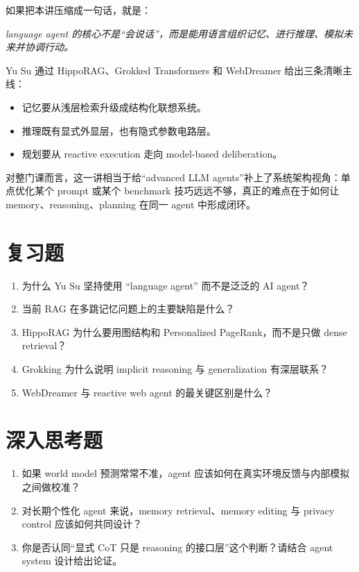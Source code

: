 如果把本讲压缩成一句话，就是：
\begin{center}
\emph{language agent 的核心不是“会说话”，而是能用语言组织记忆、进行推理、模拟未来并协调行动。}
\end{center}

Yu Su 通过 HippoRAG、Grokked Transformers 和 WebDreamer 给出三条清晰主线：
\begin{itemize}
\item 记忆要从浅层检索升级成结构化联想系统。
\item 推理既有显式外显层，也有隐式参数电路层。
\item 规划要从 reactive execution 走向 model-based deliberation。
\end{itemize}

对整门课而言，这一讲相当于给“advanced LLM agents”补上了系统架构视角：单点优化某个 prompt 或某个 benchmark 技巧远远不够，真正的难点在于如何让 memory、reasoning、planning 在同一 agent 中形成闭环。

\section{复习题}

\begin{enumerate}
\item 为什么 Yu Su 坚持使用 “language agent” 而不是泛泛的 AI agent？
\item 当前 RAG 在多跳记忆问题上的主要缺陷是什么？
\item HippoRAG 为什么要用图结构和 Personalized PageRank，而不是只做 dense retrieval？
\item Grokking 为什么说明 implicit reasoning 与 generalization 有深层联系？
\item WebDreamer 与 reactive web agent 的最关键区别是什么？
\end{enumerate}

\section{深入思考题}

\begin{enumerate}
\item 如果 world model 预测常常不准，agent 应该如何在真实环境反馈与内部模拟之间做校准？
\item 对长期个性化 agent 来说，memory retrieval、memory editing 与 privacy control 应该如何共同设计？
\item 你是否认同“显式 CoT 只是 reasoning 的接口层”这个判断？请结合 agent system 设计给出论证。
\end{enumerate}

